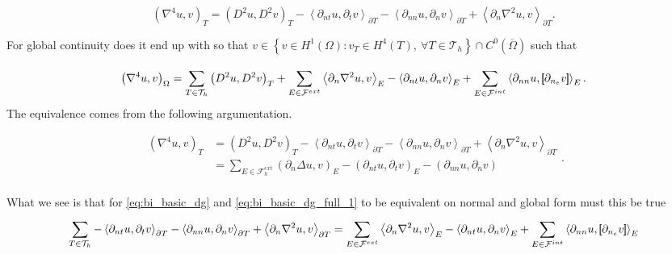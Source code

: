 \begin{equation}
\label{eq:bi_basic_dg}
\left( \nabla ^{4} u,v \right) _{T} = \left( D^2u,D^2v \right) _{T } - \left<\partial _{nt} u, \partial _{t}v
\right>_{\partial T} - \left<\partial _{nn} u, \partial _{n}v \right>_{\partial T} + \left<\partial _{n} \nabla ^2 u,v
\right>_{\partial T}
.\end{equation}

For global continuity does it end up with  so that $v \in \left\{ v \in H^{1}\left( \Omega  \right): v_{T} \in  H^{4}\left( T \right), \ \forall T \in
\mathcal{T}_{h}    \right\}   \cap C^{0} (
\overline{\Omega }  ) $ such that

\begin{equation}
\label{eq:bi_basic_dg_full_1}
\left( \nabla ^{4} u, v \right) _{\Omega }
= \sum_{T \in  \mathcal{T} _{h}}^{} \left( D^2u, D^2v \right)_{T}  + \sum_{E \in
\mathcal{F} ^{ext}_{}}^{} \left<\partial _{n} \nabla  ^2 u, v  \right> _{E}
- \left<\partial _{nt} u, \partial _{n} v \right> _{E}
+ \sum_{E \in \mathcal{F}  ^{int}}^{} \left<\partial _{nn} u , \left[\!\!\left[  \partial _{n_{e}} v  \right]\!\!\right]
\right>_{E}.
\end{equation}
The equivalence comes from the following argumentation.

\begin{equation*}
    \begin{split}
\left( \nabla ^{4} u,v \right) _{T} & = \left( D^2u,D^2v \right) _{T } - \left<\partial _{nt} u, \partial _{t}v
\right>_{\partial T} - \left<\partial _{nn} u, \partial _{n}v \right>_{\partial T} + \left<\partial _{n} \nabla ^2 u,v
\right>_{\partial T} \\
&= \sum_{E \in \mathcal{F}_{h}^{ext} }^{} \left( \partial _{n} \Delta u, v  \right)_{E} -  \left( \partial _{nt} u, \partial _{t} v \right) _{E} - \left( \partial _{nn} u, \partial _{n} v \right)   \\
    \end{split}
.\end{equation*}


What we see is that for \eqref{eq:bi_basic_dg} and \eqref{eq:bi_basic_dg_full_1} to be equivalent on normal and global form must this be true
\[
 \sum_{T \in  \mathcal{T}_{h} }^{}  - \left<\partial _{nt} u, \partial _{t}v
\right>_{\partial T} - \left<\partial _{nn} u, \partial _{n}v \right>_{\partial T} + \left<\partial _{n} \nabla ^2 u,v
\right>_{\partial T}
=  \sum_{E \in
\mathcal{F}^{ext}  }^{} \left<\partial _{n} \nabla  ^2 u, v  \right> _{E}
- \left<\partial _{nt} u, \partial _{n} v \right> _{E}
+ \sum_{E \in \mathcal{F}^{int} }^{} \left<\partial _{nn} u , \left[\!\!\left[  \partial _{n_{e}} v  \right]\!\!\right]
\right>_{E}
\]

